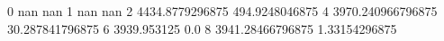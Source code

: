 0 nan nan
1 nan nan
2 4434.8779296875 494.9248046875
4 3970.240966796875 30.287841796875
6 3939.953125 0.0
8 3941.28466796875 1.33154296875
